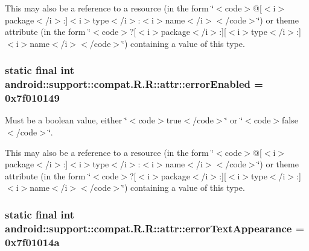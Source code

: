 This may also be a reference to a resource (in the form \char`\"{}$<$code$>$@\mbox{[}$<$i$>$package$<$/i$>$:\mbox{]}$<$i$>$type$<$/i$>$:$<$i$>$name$<$/i$>$$<$/code$>$\char`\"{}) or theme attribute (in the form \char`\"{}$<$code$>$?\mbox{[}$<$i$>$package$<$/i$>$:\mbox{]}\mbox{[}$<$i$>$type$<$/i$>$:\mbox{]}$<$i$>$name$<$/i$>$$<$/code$>$\char`\"{}) containing a value of this type. \hypertarget{classandroid_1_1support_1_1compat_1_1_r_1_1attr_5cecdb0b49f1b2fa5a0ba873b0cbf60c}{
\subsubsection[{errorEnabled}]{\setlength{\rightskip}{0pt plus 5cm}static final int android::support::compat.R.R::attr::errorEnabled = 0x7f010149}}
\label{classandroid_1_1support_1_1compat_1_1_r_1_1attr_5cecdb0b49f1b2fa5a0ba873b0cbf60c}


Must be a boolean value, either \char`\"{}$<$code$>$true$<$/code$>$\char`\"{} or \char`\"{}$<$code$>$false$<$/code$>$\char`\"{}. 

This may also be a reference to a resource (in the form \char`\"{}$<$code$>$@\mbox{[}$<$i$>$package$<$/i$>$:\mbox{]}$<$i$>$type$<$/i$>$:$<$i$>$name$<$/i$>$$<$/code$>$\char`\"{}) or theme attribute (in the form \char`\"{}$<$code$>$?\mbox{[}$<$i$>$package$<$/i$>$:\mbox{]}\mbox{[}$<$i$>$type$<$/i$>$:\mbox{]}$<$i$>$name$<$/i$>$$<$/code$>$\char`\"{}) containing a value of this type. \hypertarget{classandroid_1_1support_1_1compat_1_1_r_1_1attr_69ffec01469b3d8a28c32a0bed056663}{
\subsubsection[{errorTextAppearance}]{\setlength{\rightskip}{0pt plus 5cm}static final int android::support::compat.R.R::attr::errorTextAppearance = 0x7f01014a}}
\label{classandroid_1_1support_1_1compat_1_1_r_1_1attr_69ffec01469b3d8a28c32a0bed056663}


